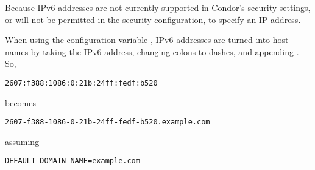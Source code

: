 Because IPv6 addresses are not currently supported in Condor's 
security settings, 
 or  will not
be permitted in the security configuration, 
to specify an IP address.

When using the configuration variable ,
IPv6 addresses are turned into host names by taking the IPv6 address, 
changing colons to dashes, and appending . 
So, 
\begin{verbatim}
2607:f388:1086:0:21b:24ff:fedf:b520
\end{verbatim}
becomes 
\begin{verbatim}
2607-f388-1086-0-21b-24ff-fedf-b520.example.com 
\end{verbatim}
assuming
\begin{verbatim}
DEFAULT_DOMAIN_NAME=example.com
\end{verbatim}

